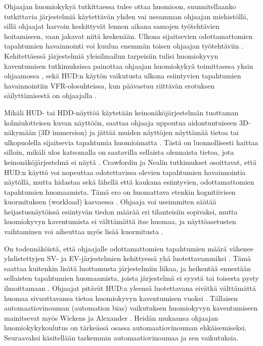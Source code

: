 \documentclass[utf8,bachelor,manualbib]{gradu3}
\begin{document}
Ohjaajan huomiokykyä tutkittaessa tulee ottaa huomioon, suunnitellaanko tutkittavia järjestelmiä käytettävän yhden vai useamman ohjaajan miehistöllä, sillä ohjaajat harvoin keskittyvät lennon aikana samojen työtehtävien hoitamiseen, vaan jakavat niitä keskenään. Ulkona sijaitsevien odottamattomien tapahtumien havainnointi voi kuulua enemmän toisen ohjaajan työtehtäviin \citep{crawfordneal2006}. Kehitettäessä järjestelmiä yleisilmailun tarpeisiin tulisi huomiokyvyn kaventumisen tutkimuksissa painottaa ohjaajan huomiokykyä toimittaessa yksin ohjaamossa \citep{crawfordneal2006}, sekä HUD:n käytön vaikutusta ulkona esiintyvien tapahtumien havainnointiin VFR-olosuhteissa, kun päävastuu riittävän erotuksen säilyttämisestä on ohjaajalla \citep{ververswickens1998}.

Mikäli HUD- tai HDD-näyttöä käytetään keinonäköjärjestelmän tuottaman kolmiulotteisen kuvan näyttöön, saattaa ohjaaja uppoutua aidontuntuiseen 3D-näkymään (3D immersion) ja jättää muiden näyttöjen näyttämää tietoa tai ulkopuolella sijaitsevia tapahtumia huomioimatta \citep{olmosym2000}. Tästä on luonnollisesti haittaa silloin, mikäli ulos katsomalla on saatavilla sellaista olennaista tietoa, jota keinonäköjärjestelmä ei näytä \citep{foylehooey2003}. Crawfordin ja Nealin \citeyearpar{crawfordneal2006} tutkimukset osoittavat, että HUD:n käyttö voi nopeuttaa odotettavissa olevien tapahtumien havainnointia näytöllä, mutta hidastaa sekä lähellä että kaukana esiintyvien, odottamattomien tapahtumien huomaamista. Tämä ero on huomattava etenkin kognitiivisen kuormituksen (workload) kasvaessa \citep{larishwickens1991}. Ohjaaja voi useimmiten säätää heijastusnäytöissä esiintyvän tiedon määrää eri tilanteisiin sopivaksi, mutta huomiokyvyn kaventumista ei välttämättä itse huomaa, ja näyttöasetusten vaihtaminen voi aiheuttaa myös lisää kuormitusta \citep{kimkaber2014}.

On todennäköistä, että ohjaajalle odottamattomien tapahtumien määrä vähenee yhdistettyjen SV- ja EV-järjestelmien kehittyessä yhä luotettavammiksi \citep{kornym2009}. Tämä saattaa kuitenkin lisätä luottamusta järjestelmiin liikaa, ja heikentää ennestään sellaisten tapahtumien huomaamista, joista järjestelmä ei syystä tai toisesta pysty ilmoittamaan \citep{molloyparasuraman1996}. Ohjaajat pitävät HUD:a yleensä luotettavana eivätkä välttämättä huomaa sivuuttavansa tietoa huomiokyvyn kaventumisen vuoksi \citep{crawfordneal2006}. Tällaisen automaatiovinouman (automation bias) \citep{mosierym1998} vaikutuksen huomiokyvyn kaventumiseen mainitsevat myös Wickens ja Alexander \citeyearpar{wickensalexander2009}. Heidän mukaansa \citeyearpar{wickensalexander2009} ohjaajan huomiokykykoulutus on tärkeässä osassa automaatiovinouman ehkäisemiseksi. Seuraavaksi käsitellään tarkemmin automaatiovinoumaa ja sen vaikutuksia.
\end{document}

